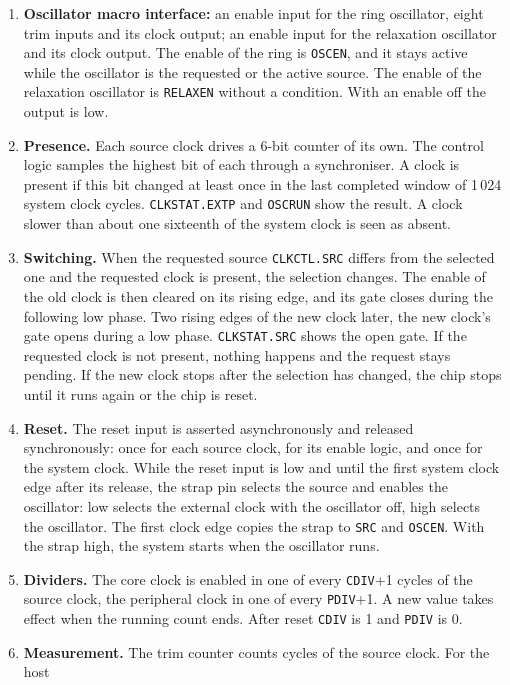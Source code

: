 \documentclass[10pt,a4paper]{article}
\newcommand{\reg}[1]{\texttt{#1}}
\begin{document}
\begin{enumerate}[label=\textbf{K\arabic*},leftmargin=2.6em]
\item \textbf{Oscillator macro interface:} an enable input for the ring oscillator, eight trim inputs and its
clock output; an enable input for the relaxation oscillator and its clock output. The enable of the ring is
\reg{OSCEN}, and it stays active while the oscillator is the requested or the active source. The enable of the
relaxation oscillator is \reg{RELAXEN} without a condition. With an enable off the output is low.
\item \textbf{Presence.} Each source clock drives a 6-bit counter of its own. The control logic samples the
highest bit of each through a synchroniser. A clock is present if this bit changed at least once in the last
completed window of 1\,024 system clock cycles. \reg{CLKSTAT.EXTP} and \reg{OSCRUN} show the result. A clock
slower than about one sixteenth of the system clock is seen as absent.
\item \textbf{Switching.} When the requested source \reg{CLKCTL.SRC} differs from the selected one and the requested
clock is present, the selection changes. The enable of the old clock is then cleared on its rising edge, and
its gate closes during the following low phase. Two rising edges of the new clock later, the new clock's gate
opens during a low phase. \reg{CLKSTAT.SRC} shows the open gate. If the requested clock is not present, nothing
happens and the request stays pending. If the new clock stops after the selection has changed, the chip
stops until it runs again or the chip is reset.
\item \textbf{Reset.} The reset input is asserted asynchronously and released synchronously: once for each source
clock, for its enable logic, and once for the system clock. While the reset input is low and until the first
system clock edge after its release, the strap pin selects the source and enables the oscillator: low selects
the external clock with the oscillator off, high selects the oscillator. The first clock edge copies the
strap to \reg{SRC} and \reg{OSCEN}. With the strap high, the system starts when the oscillator runs.
\item \textbf{Dividers.} The core clock is enabled in one of every \reg{CDIV}+1 cycles of the source clock,
the peripheral clock in one of every \reg{PDIV}+1. A new value takes effect when the running count ends.
After reset \reg{CDIV} is 1 and \reg{PDIV} is 0.
\item \textbf{Measurement.} The trim counter counts cycles of the source clock. For the host

\end{enumerate}
\end{document}
